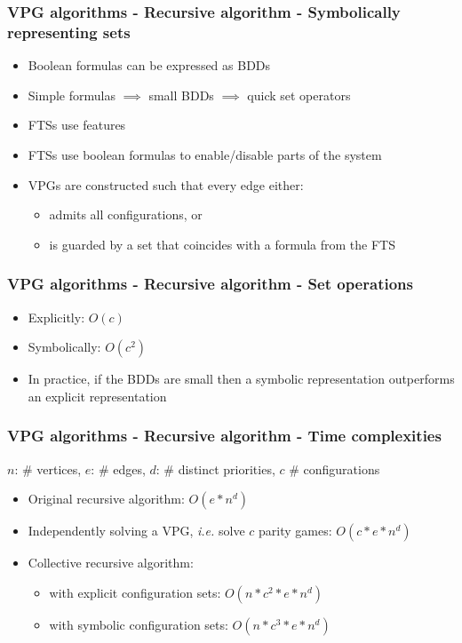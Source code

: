 \documentclass[aspectratio=169]{beamer}
\begin{document}
\begin{frame}[t]
\frametitle{VPG algorithms - Recursive algorithm - Symbolically representing sets}
	\begin{itemize}
		\item Boolean formulas can be expressed as BDDs
		\item Simple formulas $\implies$ small BDDs $\implies$ quick set operators\pause
		\item FTSs use features
		\item FTSs use boolean formulas to enable/disable parts of the system\pause
		\item VPGs are constructed such that every edge either:
		\begin{itemize}
			\item admits all configurations, or
			\item is guarded by a set that coincides with a formula from the FTS
		\end{itemize}
	\end{itemize}
\end{frame}


\begin{frame}[t]
\frametitle{VPG algorithms - Recursive algorithm - Set operations}
\begin{itemize}
	\item Explicitly: $O(c)$
	\item Symbolically: $O(c^2)$
	\item In practice, if the BDDs are small then a symbolic representation outperforms an explicit representation
\end{itemize}
\end{frame}



\begin{frame}[t]
\frametitle{VPG algorithms - Recursive algorithm - Time complexities}
\small$n$: \# vertices, $e$: \# edges, $d$: \# distinct priorities, $c$ \# configurations\normalsize
\begin{itemize}
	\item Original recursive algorithm: $O(e*n^d)$
	\item Independently solving a VPG, \textit{i.e.} solve $c$ parity games: $O(c*e*n^d)$\pause
	\item Collective recursive algorithm:
	\begin{itemize}
		\item with explicit configuration sets: $O(n*c^2*e*n^d)$
		\item with symbolic configuration sets: $O(n*c^3*e*n^d)$
	\end{itemize} 
\end{itemize}
\end{frame}
\end{document}
